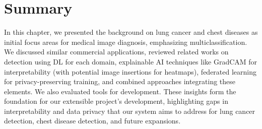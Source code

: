 \section{Summary}

In this chapter, we presented the background on lung cancer and chest diseases as initial focus areas for medical image diagnosis, emphasizing multiclassification. We discussed similar commercial applications, reviewed related works on detection using DL for each domain, explainable AI techniques like GradCAM for interpretability (with potential image insertions for heatmaps), federated learning for privacy-preserving training, and combined approaches integrating these elements. We also evaluated tools for development. These insights form the foundation for our extensible project's development, highlighting gaps in interpretability and data privacy that our system aims to address for lung cancer detection, chest disease detection, and future expansions. \newpage